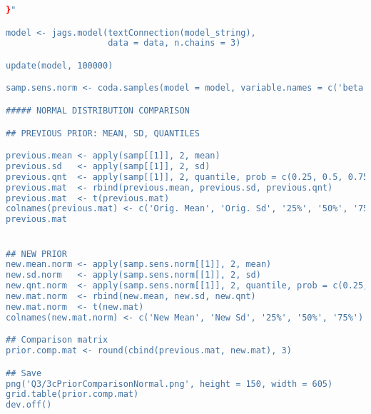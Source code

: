 \documentclass{article}
\begin{document}
\begin{lstlisting}[language=R]
}"

model <- jags.model(textConnection(model_string), 
                    data = data, n.chains = 3)

update(model, 100000)

samp.sens.norm <- coda.samples(model = model, variable.names = c('beta', 'sigma2'), n.iter = 250000, thin = 50)

##### NORMAL DISTRIBUTION COMPARISON

## PREVIOUS PRIOR: MEAN, SD, QUANTILES

previous.mean <- apply(samp[[1]], 2, mean)
previous.sd   <- apply(samp[[1]], 2, sd)
previous.qnt  <- apply(samp[[1]], 2, quantile, prob = c(0.25, 0.5, 0.75))
previous.mat  <- rbind(previous.mean, previous.sd, previous.qnt)
previous.mat  <- t(previous.mat)
colnames(previous.mat) <- c('Orig. Mean', 'Orig. Sd', '25%', '50%', '75%')
previous.mat


## NEW PRIOR
new.mean.norm <- apply(samp.sens.norm[[1]], 2, mean)
new.sd.norm   <- apply(samp.sens.norm[[1]], 2, sd)
new.qnt.norm  <- apply(samp.sens.norm[[1]], 2, quantile, prob = c(0.25, 0.5, 0.75))
new.mat.norm  <- rbind(new.mean, new.sd, new.qnt)
new.mat.norm  <- t(new.mat)
colnames(new.mat.norm) <- c('New Mean', 'New Sd', '25%', '50%', '75%')

## Comparison matrix
prior.comp.mat <- round(cbind(previous.mat, new.mat), 3)

## Save
png('Q3/3cPriorComparisonNormal.png', height = 150, width = 605)
grid.table(prior.comp.mat)
dev.off()

\end{lstlisting}
\end{document}
